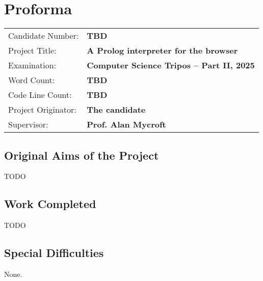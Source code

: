 \chapter*{Proforma}

{\large \begin{tabular}{ll}
Candidate Number: & {\bf TBD} \\
Project Title: & {\bf A Prolog interpreter for the browser} \\
Examination: & {\bf Computer Science Tripos -- Part II, 2025} \\
Word Count: & {\bf TBD} \\
Code Line Count: & {\bf TBD} \\
Project Originator: & {\bf The candidate} \\
Supervisor: & {\bf Prof. Alan Mycroft}
\end{tabular}}

\section*{Original Aims of the Project}

TODO

\section*{Work Completed}

TODO 

\section*{Special Difficulties}

None.